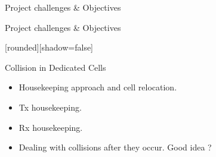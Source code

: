 \begin{withoutheadline}
\begin{frame}{Project challenges \& Objectives}
\begin{figure}[p]
\end{figure}


\end{frame}
\end{withoutheadline}


\begin{withoutheadline}
\begin{frame}{Project challenges \& Objectives}


[rounded][shadow=false]
\begin{minipage}[t]{0.48\linewidth}

\begin{block}{Collision in Dedicated Cells}
    \begin{itemize}
    \item Housekeeping approach and cell relocation.
    \item<2-> Tx housekeeping. 
    \item<5-> Rx housekeeping. 
    \item<7-> Dealing with collisions after they occur. Good idea ?
    

\end{itemize}
\end{block}
\end{minipage}
\end{frame}
\end{withoutheadline}
